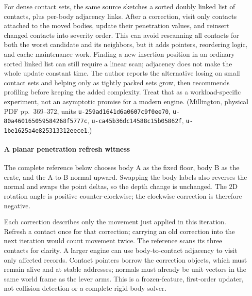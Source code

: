 For dense contact sets, the same source sketches a sorted doubly linked list of contacts, plus per-body adjacency links. After a correction, visit only contacts attached to the moved bodies, update their penetration values, and reinsert changed contacts into severity order. This can avoid rescanning all contacts for both the worst candidate and its neighbors, but it adds pointers, reordering logic, and cache-maintenance work. Finding a new insertion position in an ordinary sorted linked list can still require a linear scan; adjacency does not make the whole update constant time. The author reports the alternative losing on small contact sets and helping only as tightly packed sets grow, then recommends profiling before keeping the added complexity. Treat that as a workload-specific experiment, not an asymptotic promise for a modern engine. (Millington, physical PDF pp.~369--372, units \texttt{u-259ad1641d6a0607c9f0ee70}, \texttt{u-80a460165059584268f5777c}, \texttt{u-ca45b36dc14588c15b05862f}, \texttt{u-1be1625a4e825313312eece1}.)

\paragraph{A planar penetration refresh witness}\label{06-engine-ii-ch046-a-planar-penetration-refresh-witness}

\hypertarget{06-engine-ii-ch046-a-planar-penetration-refresh-witness}{}

The complete reference below chooses body A as the fixed floor, body B as the crate, and the A-to-B normal upward. Swapping the body labels also reverses the normal and swaps the point deltas, so the depth change is unchanged. The 2D rotation angle is positive counter-clockwise; the clockwise correction is therefore negative.

Each correction describes only the movement just applied in this iteration. Refresh a contact once for that correction; carrying an old correction into the next iteration would count movement twice. The reference scans its three contacts for clarity. A larger engine can use body-to-contact adjacency to visit only affected records. Contact pointers borrow the correction objects, which must remain alive and at stable addresses; normals must already be unit vectors in the same world frame as the lever arms. This is a frozen-feature, first-order updater, not collision detection or a complete rigid-body solver.

